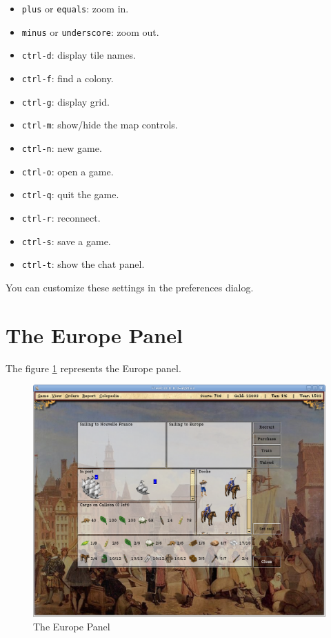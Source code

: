\documentclass[12pt]{book}
\begin{document}
\begin{itemize}
\item\verb$plus$ or \verb$equals$: zoom in.
\item\verb$minus$ or \verb$underscore$: zoom out.
\item\verb$ctrl-d$: display tile names.
\item\verb$ctrl-f$: find a colony.
\item\verb$ctrl-g$: display grid.
\item\verb$ctrl-m$: show/hide the map controls.
\item\verb$ctrl-n$: new game.
\item\verb$ctrl-o$: open a game.
\item\verb$ctrl-q$: quit the game.
\item\verb$ctrl-r$: reconnect.
\item\verb$ctrl-s$: save a game.
\item\verb$ctrl-t$: show the chat panel.
\end{itemize}

You can customize these settings in the preferences dialog.


\hypertarget{europe panel}{\section{The Europe Panel}}

The figure \ref{europe_panel_fig} represents the Europe panel.
\begin{figure}[htb]
  \begin{center}
    \includegraphics[scale=0.35]{images/europe_panel.png}
    \caption{The Europe Panel\label{europe_panel_fig}}
  \end{center}
\end{figure}
\end{document}
